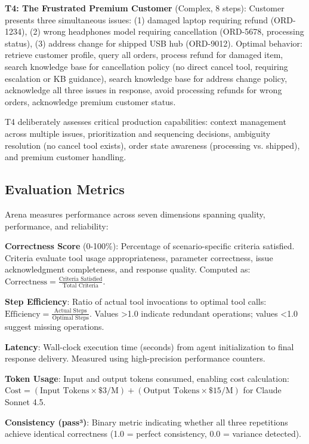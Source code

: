 \documentclass[sigconf,nonacm]{acmart}
\begin{document}
\textbf{T4: The Frustrated Premium Customer} (Complex, 8 steps): Customer presents three simultaneous issues: (1) damaged laptop requiring refund (ORD-1234), (2) wrong headphones model requiring cancellation (ORD-5678, processing status), (3) address change for shipped USB hub (ORD-9012). Optimal behavior: retrieve customer profile, query all orders, process refund for damaged item, search knowledge base for cancellation policy (no direct cancel tool, requiring escalation or KB guidance), search knowledge base for address change policy, acknowledge all three issues in response, avoid processing refunds for wrong orders, acknowledge premium customer status.

T4 deliberately assesses critical production capabilities: context management across multiple issues, prioritization and sequencing decisions, ambiguity resolution (no cancel tool exists), order state awareness (processing vs. shipped), and premium customer handling.

\subsection{Evaluation Metrics}

Arena measures performance across seven dimensions spanning quality, performance, and reliability:

\textbf{Correctness Score} (0-100\%): Percentage of scenario-specific criteria satisfied. Criteria evaluate tool usage appropriateness, parameter correctness, issue acknowledgment completeness, and response quality. Computed as: $\text{Correctness} = \frac{\text{Criteria Satisfied}}{\text{Total Criteria}}$.

\textbf{Step Efficiency}: Ratio of actual tool invocations to optimal tool calls: $\text{Efficiency} = \frac{\text{Actual Steps}}{\text{Optimal Steps}}$. Values >1.0 indicate redundant operations; values <1.0 suggest missing operations.

\textbf{Latency}: Wall-clock execution time (seconds) from agent initialization to final response delivery. Measured using high-precision performance counters.

\textbf{Token Usage}: Input and output tokens consumed, enabling cost calculation: $\text{Cost} = (\text{Input Tokens} \times \$3/\text{M}) + (\text{Output Tokens} \times \$15/\text{M})$ for Claude Sonnet 4.5.

\textbf{Consistency (pass³)}: Binary metric indicating whether all three repetitions achieve identical correctness (1.0 = perfect consistency, 0.0 = variance detected).
\end{document}
